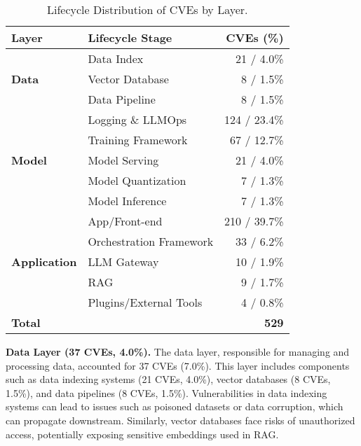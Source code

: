 \begin{table}[t]
\centering
\caption{Lifecycle Distribution of CVEs by Layer.}
\label{tab:lifecycle_components_desc}
\begin{tabular}{llr}
\toprule
\textbf{Layer}         & \textbf{Lifecycle Stage}               & \textbf{CVEs (\%)} \\ 
\midrule
\multirow{3}{*}{\textbf{Data}} 
                       & Data Index                            & 21 / 4.0\%        \\ 
                       & Vector Database                      & 8 / 1.5\%         \\ 
                       & Data Pipeline                        & 8 / 1.5\%         \\ 
\midrule
\multirow{5}{*}{\textbf{Model}} 
                       & Logging \& LLMOps                     & 124 / 23.4\%      \\ 
                       & Training Framework                   & 67 / 12.7\%       \\ 
                       & Model Serving                        & 21 / 4.0\%        \\ 
                       & Model Quantization                   & 7 / 1.3\%         \\ 
                       & Model Inference                      & 7 / 1.3\%         \\ 
\midrule
\multirow{5}{*}{\textbf{Application}} 
                       & App/Front-end                        & 210 / 39.7\%      \\ 
                       & Orchestration Framework              & 33 / 6.2\%        \\ 
                       & LLM Gateway                          & 10 / 1.9\%        \\ 
                       & RAG                                  & 9 / 1.7\%         \\ 
                       & Plugins/External Tools               & 4 / 0.8\%         \\ 
\midrule
\textbf{Total}         &                                       & \textbf{529} \\ 
\bottomrule
\end{tabular}
\end{table}

\noindent \textbf{Data Layer (37 CVEs, 4.0\%).}
The data layer, responsible for managing and processing data, accounted for 37 CVEs (7.0\%). This layer includes components such as data indexing systems (21 CVEs, 4.0\%), vector databases (8 CVEs, 1.5\%), and data pipelines (8 CVEs, 1.5\%). Vulnerabilities in data indexing systems can lead to issues such as poisoned datasets or data corruption, which can propagate downstream. Similarly, vector databases face risks of unauthorized access, potentially exposing sensitive embeddings used in RAG.

